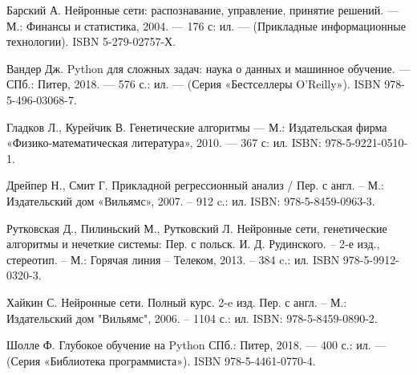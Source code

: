 \newpage

\begin{thebibliography}{99}

   Барский А. Нейронные сети: распознавание, управление, принятие решений. — М.: Финансы и статистика, 2004. — 176 с: ил. — (Прикладные информационные технологии). ISBN 5-279-02757-Х.

   Вандер Дж. Python для сложных задач: наука о данных и машинное обучение. — СПб.: Питер, 2018. — 576 с.: ил. — (Серия «Бестселлеры O’Reilly»). ISBN 978-5-496-03068-7. 

   Гладков Л., Курейчик В. Генетические алгоритмы — М.: Издательская фирма «Физико-математическая литература», 2010. — 367 с: ил. ISBN: 978-5-9221-0510-1.

  	Дрейпер Н., Смит Г. Прикладной регрессионный анализ / Пер. с англ. – М.: Издательский дом «Вильямс», 2007. – 912 c.: ил. ISBN: 978-5-8459-0963-3.

   Рутковская Д., Пилиньский М., Рутковский Л. Нейронные сети, генетические алгоритмы и нечеткие системы: Пер. с польск.  И. Д. Рудинского. – 2-е изд., стереотип. –  М.: Горячая линия – Телеком, 2013. – 384 c.: ил. ISBN 978-5-9912-0320-3.

   Хайкин С. Нейронные сети. Полный курс. 2-e изд. Пер. с англ. – М.: Издательский дом "Вильямс", 2006. – 1104 с.: ил. ISBN: 978-5-8459-0890-2.

   Шолле Ф. Глубокое обучение на Python 
  СПб.: Питер, 2018. — 400 с.: ил. — (Серия «Библиотека программиста»). ISBN 978-5-4461-0770-4.

\end{thebibliography}